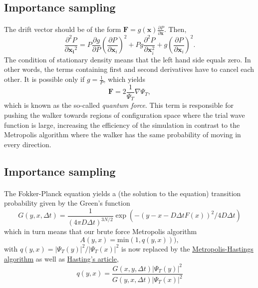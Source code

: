 \documentclass[%
twoside,                 %
final,                   %
10pt]{article}
\begin{document}
\subsection*{Importance sampling}

\paragraph{}
The drift vector should be of the form $\mathbf{F} = g(\mathbf{x}) \frac{\partial P}{\partial \mathbf{x}}$. Then,
\[
\frac{\partial^2 P}{\partial {\mathbf{x_i}^2}} = P\frac{\partial g}{\partial P}\left( \frac{\partial P}{\partial {\mathbf{x}_i}}  \right)^2 + P g \frac{\partial ^2 P}{\partial {\mathbf{x}_i^2}}  + g \left( \frac{\partial P}{\partial {\mathbf{x}_i}}  \right)^2.
\]
The condition of stationary density means that the left hand side equals zero. In other words, the terms containing first and second derivatives have to cancel each other. It is possible only if $g = \frac{1}{P}$, which yields
\[
\mathbf{F} = 2\frac{1}{\Psi_T}\nabla\Psi_T,
\]
which is known as the so-called \emph{quantum force}. This term is responsible for pushing the walker towards regions of configuration space where the trial wave function is large, increasing the efficiency of the simulation in contrast to the Metropolis algorithm where the walker has the same probability of moving in every direction.





\subsection*{Importance sampling}

\paragraph{}
The Fokker-Planck equation yields a (the solution to the equation) transition probability given by the Green's function
\[
  G(y,x,\Delta t) = \frac{1}{(4\pi D\Delta t)^{3N/2}} \exp{\left(-(y-x-D\Delta t F(x))^2/4D\Delta t\right)}
\]
which in turn means that our brute force Metropolis algorithm
\[ 
    A(y,x) = \mathrm{min}(1,q(y,x))),
\]
with $q(y,x) = |\Psi_T(y)|^2/|\Psi_T(x)|^2$ is now replaced by the \href{{http://scitation.aip.org/content/aip/journal/jcp/21/6/10.1063/1.1699114}}{Metropolis-Hastings algorithm} as well as \href{{http://biomet.oxfordjournals.org/content/57/1/97.abstract}}{Hasting's article}, 
\[
q(y,x) = \frac{G(x,y,\Delta t)|\Psi_T(y)|^2}{G(y,x,\Delta t)|\Psi_T(x)|^2}
\]
\end{document}
